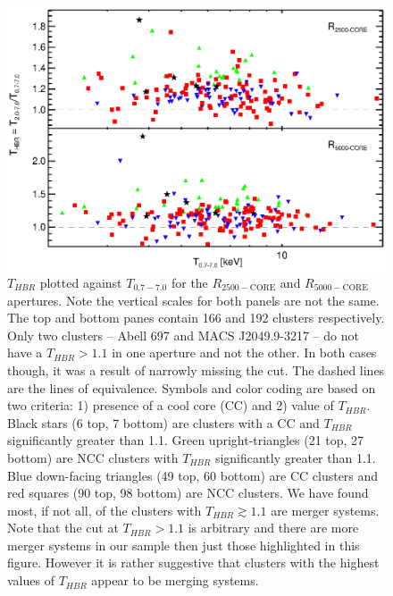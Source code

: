 \clearpage
\begin{figure}
\begin{center}
\includegraphics*[width=\textwidth, trim=15mm 10mm 0mm 0mm, clip]{f8.eps}
\caption{
$T_{HBR}$ plotted against $T_{0.7-7.0}$ for the
$R_{2500-\mathrm{CORE}}$ and $R_{5000-\mathrm{CORE}}$ apertures. Note
the vertical scales for both panels are not the same. The top and
bottom panes contain 166 and 192 clusters respectively. Only two
clusters -- Abell 697 and MACS J2049.9-3217 -- do not have a $T_{HBR}
> 1.1$ in one aperture and not the other. In both cases though, it was
a result of narrowly missing the cut. The dashed lines are the lines
of equivalence. Symbols and color coding are based on two criteria: 1)
presence of a cool core (CC) and 2) value of $T_{HBR}$. Black stars (6
top, 7 bottom) are clusters with a CC and $T_{HBR}$ significantly
greater than 1.1. Green upright-triangles (21 top, 27 bottom) are NCC
clusters with $T_{HBR}$ significantly greater than 1.1. Blue
down-facing triangles (49 top, 60 bottom) are CC clusters and red
squares (90 top, 98 bottom) are NCC clusters. We have found most, if
not all, of the clusters with $T_{HBR} \gtrsim 1.1$ are merger
systems. Note that the cut at $T_{HBR} > 1.1$ is arbitrary and there
are more merger systems in our sample then just those highlighted in
this figure. However it is rather suggestive that clusters with the
highest values of $T_{HBR}$ appear to be merging systems.
}
\label{fig:ftx_tx}
\end{center}
\end{figure}
\clearpage
